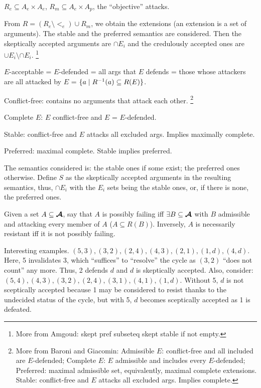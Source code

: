 \documentclass[version=3.21, pagesize, twoside=off, bibliography=totoc, DIV=calc, fontsize=12pt, a4paper, french, english]{scrartcl}
\begin{document}
$R_e \subseteq A_e × A_e$, $R_m \subseteq A_e × A_p$, the “objective” attacks. 

From $R = (R_e \setminus {<_e}) \cup R_m$, we obtain the extensions (an extension is a set of arguments). The stable and the preferred semantics are considered. Then the skeptically accepted arguments are $\cap E_i$ and the credulously accepted ones are $\cup E_i \setminus \cap E_i$.
\footnote{More from Amgoud: skept pref subseteq skept stable if not empty.}

$E$-acceptable = $E$-defended = all args that $E$ defends = those whose attackers are all attacked by $E$ = $\set{a \suchthat R^{-1}(a)\subseteq R(E)}$.

Conflict-free: contains no arguments that attack each other.
\footnote{More from Baroni and Giacomin: Admissible $E$: conflict-free and all included are $E$-defended; Complete $E$: $E$ admissible and includes every $E$-defended; Preferred: maximal admissible set, equivalently, maximal complete extensions. Stable: conflict-free and $E$ attacks all excluded args. Implies complete.}

Complete $E$: $E$ conflict-free and $E$ = $E$-defended.

Stable: conflict-free and $E$ attacks all excluded args. Implies maximally complete.

Preferred: maximal complete. Stable implies preferred. 

The semantics considered is: the stable ones if some exist; the preferred ones otherwise. Define $S$ as the skeptically accepted arguments in the resulting semantics, thus, $\cap E_i$ with the $E_i$ sets being the stable ones, or, if there is none, the preferred ones.

Given a set $A \subseteq \bm{\mathcal{A}}$, say that $A$ is possibly failing iff $\exists B \subseteq \bm{\mathcal{A}}$ with $B$ admissible and attacking every member of $A$ ($A \subseteq R(B)$).
Inversely, $A$ is necessarily resistant iff it is not possibly failing.

Interesting examples. $(5, 3), (3, 2), (2, 4), (4, 3), (2, 1), (1, d), (4, d)$. Here, 5 invalidates 3, which “suffices” to “resolve” the cycle as $(3, 2)$ “does not count” any more. Thus, 2 defends $d$ and $d$ is skeptically accepted. Also, consider: $(5, 4), (4, 3), (3, 2), (2, 4), (3, 1), (4, 1), (1, d)$. Without 5, $d$ is not sceptically accepted because 1 may be considered to resist thanks to the undecided status of the cycle, but with 5, $d$ becomes sceptically accepted as 1 is defeated.
\end{document}
